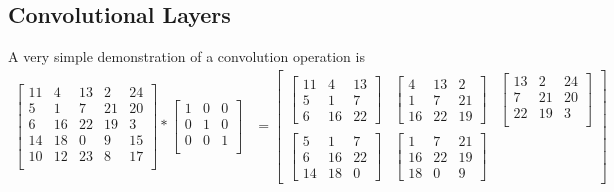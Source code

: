 \documentclass[../../deep_learning_notes.tex]{subfiles}
\begin{document}
\subsection{Convolutional Layers}
A very simple demonstration of a convolution operation is 
\begin{align*}
    \begin{bmatrix}
        11  &4 &13  &2 &24\\
        5   &1  &7 &21 &20\\
        6  &16 &22 &19  &3\\
       14  &18  &0  &9 &15\\
       10  &12 &23  &8 &17\\
    \end{bmatrix} *
    \begin{bmatrix}
        1 &0 &0\\
        0 &1 &0\\
        0 &0 &1\\
    \end{bmatrix} &= 
    \begin{bmatrix}
        \begin{bmatrix}
            11  &4 &13\\
            5   &1  &7\\
            6  &16 &22
        \end{bmatrix}
        &\begin{bmatrix}
            4 &13  &2\\
            1  &7 &21\\
            16 &22 &19
        \end{bmatrix}
        &\begin{bmatrix}
            13  &2 &24\\
            7 &21 &20\\
            22 &19  &3\\
        \end{bmatrix}\\
        \begin{bmatrix}
            5   &1  &7\\
            6  &16 &22\\
            14  &18 &0
        \end{bmatrix}
        &\begin{bmatrix}
            1  &7 &21\\
            16 &22 &19\\
            18 &0 &9
        \end{bmatrix}

\end{bmatrix}
\end{align*}
\end{document}
